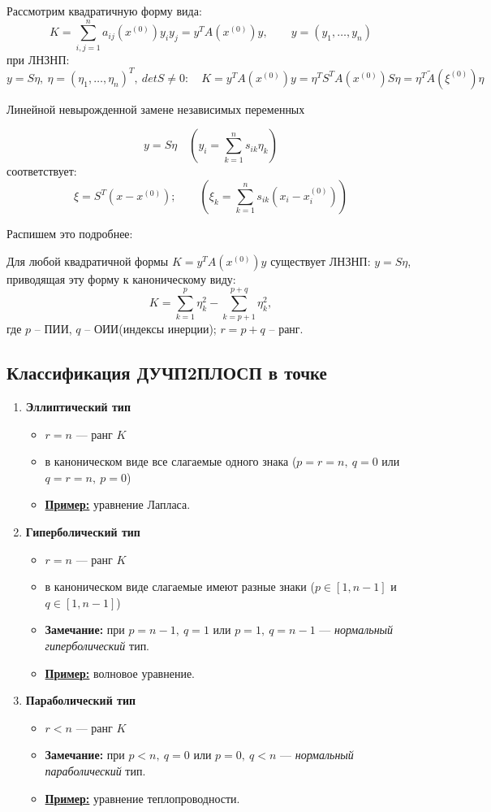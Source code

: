 Рассмотрим квадратичную форму вида:
$$ K=\sum_{i,j=1}^n a_{ij}(x^{(0)})y_i y_j = y^T A(x^{(0)})y, \qquad y = (y_1, \dots , y_n) $$
при ЛНЗНП:
\[
	y=S\eta,\ \eta=(\eta_1, \ldots, \eta_n)^T,\ detS \neq 0:
	\quad
	K=y^TA(x^{(0)})y= \eta^T S^T A(x^{(0)}) S\eta =\eta^T\tilde A(\xi^{(0)})\eta
\]

Линейной невырожденной замене независимых переменных

\[y=S\eta\quad (y_i=\sum_{k=1}^ns_{ik}\eta_k)\] соответствует: \[\xi=S^T(x-x^{(0)});\qquad (\xi_k=\sum_{k=1}^ns_{ik}(x_i-x_i^{(0)})) \]

Распишем это подробнее:

Для любой квадратичной формы $K=y^TA(x^{(0)})y$ существует ЛНЗНП: $y=S\eta$, приводящая эту форму к каноническому виду:
\[
	K = \sum_{k=1}^p \eta_k^2 - \sum_{k=p+1}^{p+q} \eta_k^2,
\]
где $p$ -- ПИИ, $q$ -- ОИИ(индексы инерции); $r=p+q$ -- ранг.

\subsection{Классификация ДУЧП2ПЛОСП в точке}
\begin{enumerate}[label=\Roman*.]
	\item \textbf{Эллиптический тип}
	      \begin{itemize}[nosep]
		      \item $r = n$ --- ранг $K$
		      \item в каноническом виде все слагаемые одного знака
		            ($p = r = n,\ q = 0$ или $q = r = n,\ p = 0$)
		      \item \textbf{\underline{Пример:}} уравнение Лапласа.
	      \end{itemize}

	\item \textbf{Гиперболический тип}
	      \begin{itemize}[nosep]
		      \item $r = n$ --- ранг $K$
		      \item в каноническом виде слагаемые имеют разные знаки
		            ($p \in [1, n-1]$ и $q \in [1, n-1]$)
		      \item \textbf{Замечание:} при $p = n-1,\ q = 1$ или $p = 1,\ q = n-1$ ---
		            \emph{нормальный гиперболический} тип.
		      \item \textbf{\underline{Пример:}} волновое уравнение.
	      \end{itemize}

	\item \textbf{Параболический тип}
	      \begin{itemize}[nosep]
		      \item $r < n$ --- ранг $K$
		      \item \textbf{Замечание:} при $p < n,\ q = 0$ или $p = 0,\ q < n$ ---
		            \emph{нормальный параболический} тип.
		      \item \textbf{\underline{Пример:}} уравнение теплопроводности.
	      \end{itemize}
\end{enumerate}

